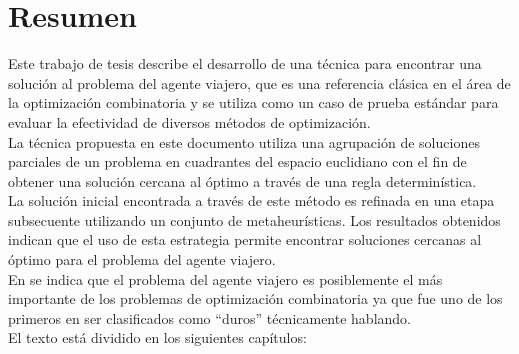 \section*{Resumen}
\hspace*{1cm}Este trabajo de tesis describe el desarrollo de una técnica para encontrar una solución al problema del agente viajero, que es una referencia clásica en el área de la optimización combinatoria y se utiliza como un caso de prueba estándar para evaluar la efectividad de diversos métodos de optimización.\\
\hspace*{1cm}La técnica propuesta en este documento utiliza una agrupación de soluciones parciales de un problema en cuadrantes del espacio euclidiano con el fin de obtener una solución cercana al óptimo a través de una regla determinística.\\
\hspace*{1cm}La solución inicial encontrada a través de este método es refinada en una etapa subsecuente utilizando un conjunto de metaheurísticas. Los resultados obtenidos indican que el uso de esta estrategia permite encontrar soluciones cercanas al óptimo para el problema del agente viajero.\\
\hspace*{1cm}En \cite{[REF1]} se indica que el problema del agente viajero es posiblemente el más importante de los problemas de optimización combinatoria ya que fue uno de los primeros en ser clasificados como “duros” técnicamente hablando.\\
\hspace*{1cm} El texto está dividido en los siguientes capítulos:
